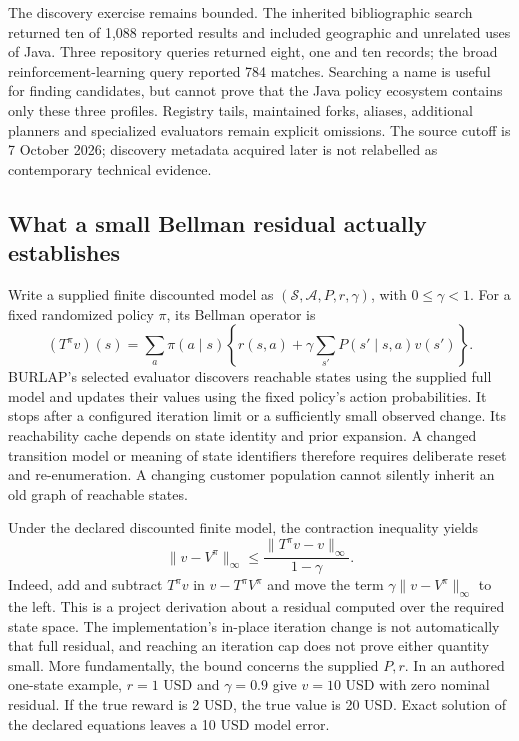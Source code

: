 The discovery exercise remains bounded. The inherited bibliographic search returned ten of 1,088 reported results and included geographic and unrelated uses of Java. Three repository queries returned eight, one and ten records; the broad reinforcement-learning query reported 784 matches. Searching a name is useful for finding candidates, but cannot prove that the Java policy ecosystem contains only these three profiles. Registry tails, maintained forks, aliases, additional planners and specialized evaluators remain explicit omissions. The source cutoff is 7 October 2026; discovery metadata acquired later is not relabelled as contemporary technical evidence.~\citep{exec24_policyjava_comparison}

\subsection{What a small Bellman residual actually establishes}
Write a supplied finite discounted model as $(\mathcal S,\mathcal A,P,r,\gamma)$, with $0\leq\gamma<1$. For a fixed randomized policy $\pi$, its Bellman operator is
\[
 (T^\pi v)(s)=\sum_a\pi(a\mid s)\left\{r(s,a)+\gamma\sum_{s'}P(s'\mid s,a)v(s')\right\}.
\]
BURLAP's selected evaluator discovers reachable states using the supplied full model and updates their values using the fixed policy's action probabilities. It stops after a configured iteration limit or a sufficiently small observed change. Its reachability cache depends on state identity and prior expansion. A changed transition model or meaning of state identifiers therefore requires deliberate reset and re-enumeration. A changing customer population cannot silently inherit an old graph of reachable states.~\citep{exec24_policyjava_burlap}

Under the declared discounted finite model, the contraction inequality yields
\[
 \|v-V^\pi\|_\infty\leq
 \frac{\|T^\pi v-v\|_\infty}{1-\gamma}.
\]
Indeed, add and subtract $T^\pi v$ in $v-T^\pi V^\pi$ and move the term $\gamma\|v-V^\pi\|_\infty$ to the left. This is a project derivation about a residual computed over the required state space. The implementation's in-place iteration change is not automatically that full residual, and reaching an iteration cap does not prove either quantity small. More fundamentally, the bound concerns the supplied $P,r$. In an authored one-state example, $r=1$ USD and $\gamma=0.9$ give $v=10$ USD with zero nominal residual. If the true reward is 2 USD, the true value is 20 USD. Exact solution of the declared equations leaves a 10 USD model error.~\citep{exec24_policyjava_comparison}


